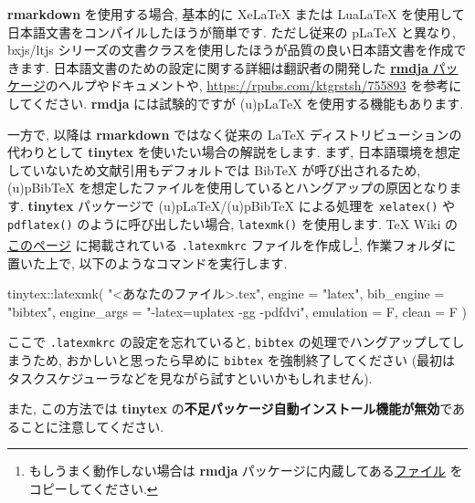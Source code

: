 \documentclass[
  xelatex,ja=standard,jafont=noto]{bxjsreport}
\newenvironment{Shaded}{\begin{snugshade}}{\end{snugshade}}
\newcommand{\AttributeTok}[1]{\textcolor[rgb]{0.77,0.63,0.00}{#1}}
\newcommand{\FunctionTok}[1]{\textcolor[rgb]{0.00,0.00,0.00}{#1}}
\newcommand{\NormalTok}[1]{#1}
\newcommand{\SpecialCharTok}[1]{\textcolor[rgb]{0.00,0.00,0.00}{#1}}
\newcommand{\StringTok}[1]{\textcolor[rgb]{0.31,0.60,0.02}{#1}}
\begin{document}
\textbf{rmarkdown} を使用する場合, 基本的に XeLaTeX または LuaLaTeX
を使用して日本語文書をコンパイルしたほうが簡単です. ただし従来の pLaTeX
と異なり, bxjs/ltjs
シリーズの文書クラスを使用したほうが品質の良い日本語文書を作成できます.
日本語文書のための設定に関する詳細は翻訳者の開発した
\href{https://github.com/Gedevan-Aleksizde/rmdja}{\textbf{rmdja}
パッケージ}のヘルプやドキュメントや,
\url{https://rpubs.com/ktgrstsh/755893} を参考にしてください.
\textbf{rmdja} には試験的ですが (u)pLaTeX を使用する機能もあります.

一方で, 以降は \textbf{rmarkdown} ではなく従来の LaTeX
ディストリビューションの代わりとして \textbf{tinytex}
を使いたい場合の解説をします. まず,
日本語環境を想定していないため文献引用もデフォルトでは BibTeX
が呼び出されるため, (u)pBibTeX
を想定したファイルを使用しているとハングアップの原因となります.
\textbf{tinytex} パッケージで (u)pLaTeX/(u)pBibTeX による処理を
\texttt{xelatex()} や \texttt{pdflatex()} のように呼び出したい場合,
\texttt{latexmk()} を使用します. TeX Wiki
の\href{https://texwiki.texjp.org/?Latexmk}{このページ} に掲載されている
\texttt{.latexmkrc} ファイルを作成し\footnote{もしうまく動作しない場合は
  \textbf{rmdja}
  パッケージに内蔵してある\href{https://github.com/Gedevan-Aleksizde/rmdja/blob/master/inst/resources/latexmk/.latexmkrc}{ファイル}
  をコピーしてください.}, 作業フォルダに置いた上で,
以下のようなコマンドを実行します.

\begin{Shaded}
\begin{Highlighting}[numbers=left,,]
\NormalTok{tinytex}\SpecialCharTok{::}\FunctionTok{latexmk}\NormalTok{(}
  \StringTok{"\textless{}あなたのファイル\textgreater{}.tex"}\NormalTok{,}
  \AttributeTok{engine =} \StringTok{"latex"}\NormalTok{,}
  \AttributeTok{bib\_engine =} \StringTok{"bibtex"}\NormalTok{,}
  \AttributeTok{engine\_args =} \StringTok{"{-}latex=uplatex {-}gg {-}pdfdvi"}\NormalTok{,}
  \AttributeTok{emulation =}\NormalTok{ F,}
  \AttributeTok{clean =}\NormalTok{ F}
\NormalTok{)}
\end{Highlighting}
\end{Shaded}

ここで \texttt{.latexmkrc} の設定を忘れていると, \texttt{bibtex}
の処理でハングアップしてしまうため, おかしいと思ったら早めに
\texttt{bibtex} を強制終了してください
(最初はタスクスケジューラなどを見ながら試すといいかもしれません).

また, この方法では \textbf{tinytex}
の\textbf{不足パッケージ自動インストール機能が無効}であることに注意してください.
\end{document}
